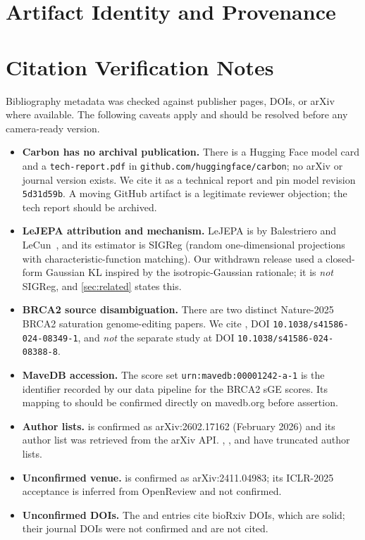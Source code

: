 \documentclass{article}
\begin{document}
\section{Artifact Identity and Provenance}
\label{app:artifacts}
\tabArtifacts

\section{Citation Verification Notes}
\label{app:citations}
Bibliography metadata was checked against publisher pages, DOIs, or arXiv where available. The
following caveats apply and should be resolved before any camera-ready version.
\begin{itemize}[leftmargin=1.4em,itemsep=1pt,topsep=2pt]
\item \textbf{Carbon has no archival publication.} There is a Hugging Face model card and a
\texttt{tech-report.pdf} in \texttt{github.com/huggingface/carbon}; no arXiv or journal version
exists. We cite it as a technical report and pin model revision \texttt{5d31d59b}. A moving GitHub
artifact is a legitimate reviewer objection; the tech report should be archived.
\item \textbf{LeJEPA attribution and mechanism.} LeJEPA is by Balestriero and
LeCun~\citep{lejepa2025}, and its estimator is SIGReg (random one-dimensional projections with
characteristic-function matching). Our withdrawn release used a closed-form Gaussian KL inspired by
the isotropic-Gaussian rationale; it is \emph{not} SIGReg, and \cref{sec:related} states this.
\item \textbf{BRCA2 source disambiguation.} There are two distinct Nature-2025 BRCA2 saturation
genome-editing papers. We cite \citet{sahu2025}, DOI \texttt{10.1038/s41586-024-08349-1}, and
\emph{not} the separate study at DOI \texttt{10.1038/s41586-024-08388-8}.
\item \textbf{MaveDB accession.} The score set \texttt{urn:mavedb:00001242-a-1} is the identifier
recorded by our data pipeline for the BRCA2 sGE scores. Its mapping to \citet{sahu2025} should be
confirmed directly on mavedb.org before assertion.
\item \textbf{Author lists.} \citet{jepadna2026} is confirmed as arXiv:2602.17162
(February 2026) and its author list was retrieved from the arXiv API. \citet{vjepa2_2025},
\citet{dinov2_2024}, and \citet{mavedb2025} have truncated author lists.
\item \textbf{Unconfirmed venue.} \citet{dinowm2025} is confirmed as arXiv:2411.04983; its
ICLR-2025 acceptance is inferred from OpenReview and not confirmed.
\item \textbf{Unconfirmed DOIs.} The \citet{evo2_2025} and \citet{alphagenome2025} entries cite
bioRxiv DOIs, which are solid; their journal DOIs were not confirmed and are not cited.
\end{itemize}
\end{document}
